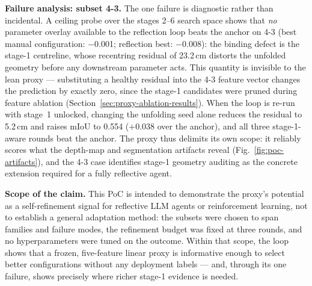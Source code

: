 \textbf{Failure analysis: subset 4-3.} The one failure is diagnostic rather
than incidental. A ceiling probe over the stages 2--6 search space shows that
\emph{no} parameter overlay available to the reflection loop beats the anchor
on 4-3 (best manual configuration: $-$0.001; reflection best: $-$0.008): the
binding defect is the stage-1 centreline, whose recentring residual of
23.2\,cm distorts the unfolded geometry before any downstream parameter acts.
This quantity is invisible to the lean proxy --- substituting a healthy
residual into the 4-3 feature vector changes the prediction by exactly zero,
since the stage-1 candidates were pruned during feature ablation
(Section~\ref{sec:proxy-ablation-results}). When the loop is re-run with
stage~1 unlocked, changing the unfolding seed alone reduces the residual to
5.2\,cm and raises mIoU to 0.554 ($+$0.038 over the anchor), and all three
stage-1-aware rounds beat the anchor. The proxy thus delimits its own scope:
it reliably scores what the depth-map and segmentation artifacts reveal
(Fig.~\ref{fig:poc-artifacts}), and the 4-3 case identifies stage-1 geometry
auditing as the concrete extension required for a fully reflective agent.

\textbf{Scope of the claim.} This PoC is intended to demonstrate the proxy's
potential as a self-refinement signal for reflective LLM agents or
reinforcement learning, not to establish a general adaptation method: the
subsets were chosen to span families and failure modes, the refinement budget
was fixed at three rounds, and no hyperparameters were tuned on the outcome.
Within that scope, the loop shows that a frozen, five-feature linear proxy is
informative enough to select better configurations without any deployment
labels --- and, through its one failure, shows precisely where richer stage-1
evidence is needed.

